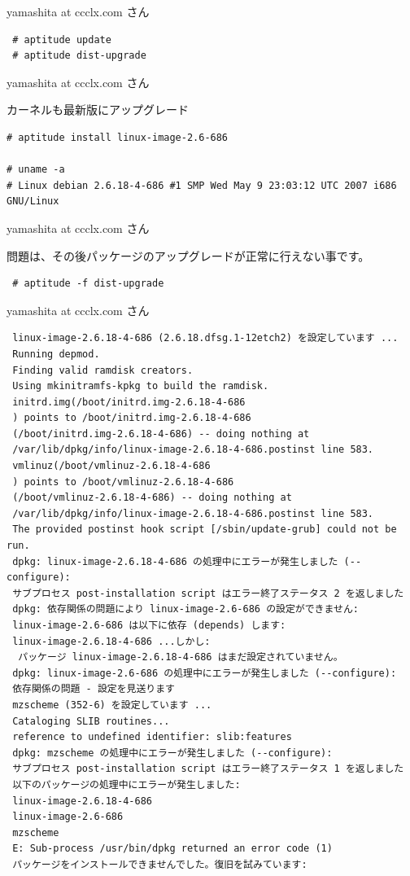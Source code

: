 \documentclass[cjk,dvipdfmx,12pt]{beamer}
\begin{document}
\begin{frame}[containsverbatim]{yamashita at ccclx.com さん}
\begin{verbatim}
 # aptitude update
 # aptitude dist-upgrade
\end{verbatim}

\end{frame}\begin{frame}[containsverbatim]{yamashita at ccclx.com さん}

カーネルも最新版にアップグレード

\begin{verbatim}
# aptitude install linux-image-2.6-686

# uname -a
# Linux debian 2.6.18-4-686 #1 SMP Wed May 9 23:03:12 UTC 2007 i686 
GNU/Linux
\end{verbatim}

\end{frame}\begin{frame}[containsverbatim]{yamashita at ccclx.com さん}

問題は、その後パッケージのアップグレードが正常に行えない事です。

\begin{verbatim}
 # aptitude -f dist-upgrade
\end{verbatim}

\end{frame}\begin{frame}[containsverbatim]{yamashita at ccclx.com さん}

\begin{verbatim}
 linux-image-2.6.18-4-686 (2.6.18.dfsg.1-12etch2) を設定しています ...
 Running depmod.
 Finding valid ramdisk creators.
 Using mkinitramfs-kpkg to build the ramdisk.
 initrd.img(/boot/initrd.img-2.6.18-4-686
 ) points to /boot/initrd.img-2.6.18-4-686
 (/boot/initrd.img-2.6.18-4-686) -- doing nothing at 
 /var/lib/dpkg/info/linux-image-2.6.18-4-686.postinst line 583.
 vmlinuz(/boot/vmlinuz-2.6.18-4-686
 ) points to /boot/vmlinuz-2.6.18-4-686
 (/boot/vmlinuz-2.6.18-4-686) -- doing nothing at 
 /var/lib/dpkg/info/linux-image-2.6.18-4-686.postinst line 583.
 The provided postinst hook script [/sbin/update-grub] could not be run.
 dpkg: linux-image-2.6.18-4-686 の処理中にエラーが発生しました (--configure):
 サブプロセス post-installation script はエラー終了ステータス 2 を返しました
 dpkg: 依存関係の問題により linux-image-2.6-686 の設定ができません:
 linux-image-2.6-686 は以下に依存 (depends) します: 
 linux-image-2.6.18-4-686 ...しかし:
  パッケージ linux-image-2.6.18-4-686 はまだ設定されていません。
 dpkg: linux-image-2.6-686 の処理中にエラーが発生しました (--configure):
 依存関係の問題 - 設定を見送ります
 mzscheme (352-6) を設定しています ...
 Cataloging SLIB routines...
 reference to undefined identifier: slib:features
 dpkg: mzscheme の処理中にエラーが発生しました (--configure):
 サブプロセス post-installation script はエラー終了ステータス 1 を返しました
 以下のパッケージの処理中にエラーが発生しました:
 linux-image-2.6.18-4-686
 linux-image-2.6-686
 mzscheme
 E: Sub-process /usr/bin/dpkg returned an error code (1)
 パッケージをインストールできませんでした。復旧を試みています:
\end{verbatim}


\end{frame}
\end{document}
